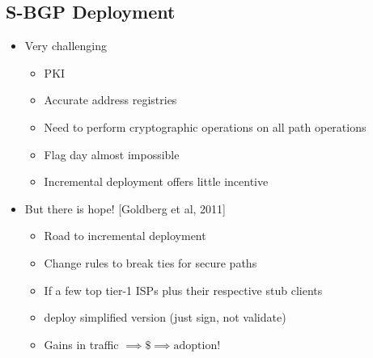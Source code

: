 \subsection{S-BGP Deployment}
\begin{itemize}[nosep]
    \item Very challenging
          \begin{itemize}[nosep]
              \item PKI
              \item Accurate address registries
              \item Need to perform cryptographic operations on all path operations
              \item Flag day almost impossible
              \item Incremental deployment offers little incentive
          \end{itemize}
    \item But there is hope! [Goldberg et al, 2011]
          \begin{itemize}[nosep]
              \item Road to incremental deployment
              \item Change rules to break ties for secure paths
              \item If a few top tier-1 ISPs plus their respective stub clients
              \item deploy simplified version (just sign, not validate)
              \item Gains in traffic $\implies \$ \implies \text{adoption}$!
          \end{itemize}
\end{itemize}

